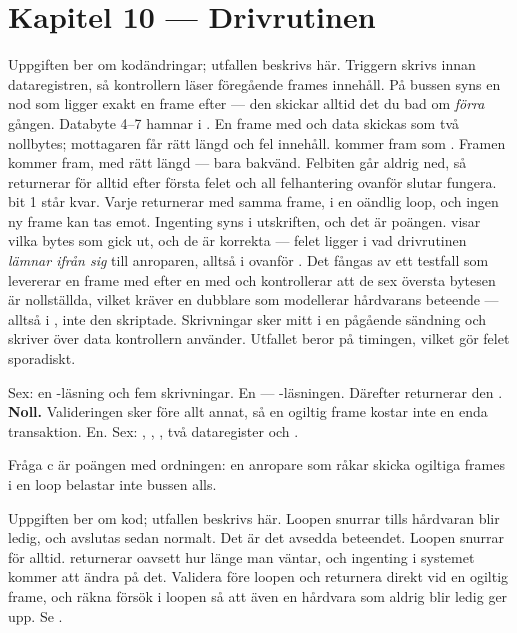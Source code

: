 \section*{Kapitel 10 --- Drivrutinen}

Uppgiften ber om kodändringar; utfallen beskrivs här.
 Triggern skrivs innan dataregistren, så kontrollern läser föregående frames innehåll.
På bussen syns en nod som ligger exakt en frame efter --- den skickar alltid det du bad om
\emph{förra} gången.
 Databyte 4--7 hamnar i . En frame med  och data
 skickas som två nollbytes; mottagaren får rätt längd och fel innehåll.
  kommer fram som . Framen kommer fram, med rätt
längd --- bara bakvänd.
 Felbiten går aldrig ned, så  returnerar  för alltid efter
första felet och all felhantering ovanför slutar fungera.
  bit 1 står kvar. Varje  returnerar  med samma
frame, i en oändlig loop, och ingen ny frame kan tas emot.
 Ingenting syns i utskriften, och det är poängen.  visar vilka bytes
som gick ut, och de är korrekta --- felet ligger i vad drivrutinen \emph{lämnar ifrån sig} till
anroparen, alltså i  ovanför . Det fångas av ett testfall som levererar
en frame med  efter en med  och kontrollerar att de sex översta
bytesen är nollställda, vilket kräver en dubblare som modellerar hårdvarans beteende --- alltså
 i , inte den skriptade.
 Skrivningar sker mitt i en pågående sändning och skriver över data kontrollern använder.
Utfallet beror på timingen, vilket gör felet sporadiskt.

 Sex: en -läsning och fem skrivningar.
 En --- -läsningen. Därefter returnerar den .
 \textbf{Noll.} Valideringen sker före allt annat, så en ogiltig frame kostar inte en enda
transaktion.
 En.
 Sex: , , , två dataregister och .

Fråga c är poängen med ordningen: en anropare som råkar skicka ogiltiga frames i en loop belastar
inte bussen alls.

Uppgiften ber om kod; utfallen beskrivs här.
 Loopen snurrar tills hårdvaran blir ledig, och avslutas sedan normalt. Det är det avsedda
beteendet.
 Loopen snurrar för alltid.  returnerar  oavsett hur länge man
väntar, och ingenting i systemet kommer att ändra på det.
 Validera före loopen och returnera direkt vid en ogiltig frame, och räkna försök i loopen
så att även en hårdvara som aldrig blir ledig ger upp. Se .

